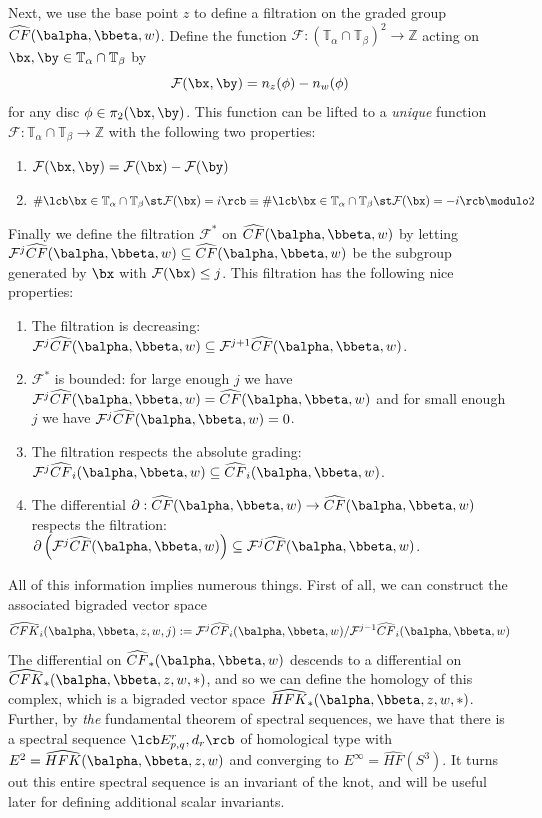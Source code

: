 Next, we use the base point $z$ to define a filtration on the graded group $\widehat{CF}(\balpha,\bbeta,w)$. Define the function $\mathcal F : (\mathbb T_\alpha \cap \mathbb T_\beta)^2 \rightarrow \mathbb Z$ acting on $\bx,\by \in \mathbb T_\alpha \cap \mathbb T_\beta$ by
\[ \mathcal F(\bx,\by) = n_z(\phi) - n_w(\phi) \]
for any disc $\phi \in \pi_2(\bx,\by)$. This function can be lifted to a \emph{unique} function $\mathcal F : \mathbb T_\alpha \cap \mathbb T_\beta \rightarrow \mathbb Z$ with the following two properties:
\begin{enumerate}
	\item $\mathcal F(\bx,\by) = \mathcal F(\bx) - \mathcal F(\by)$
	\item $\# \lcb \bx \in \mathbb T_\alpha \cap \mathbb T_\beta \st \mathcal F(\bx) = i \rcb \equiv \# \lcb \bx \in \mathbb T_\alpha \cap \mathbb T_\beta \st \mathcal F(\bx) = -i \rcb \modulo 2$
\end{enumerate}
Finally we define the filtration $\mathcal F^*$ on $\widehat{CF}(\balpha,\bbeta,w)$ by letting $\mathcal F^j \widehat{CF}(\balpha,\bbeta,w) \subseteq \widehat{CF}(\balpha,\bbeta,w)$ be the subgroup generated by $\bx$ with $\mathcal F(\bx) \leq j$. This filtration has the following nice properties:
\begin{enumerate}
	\item The filtration is decreasing: $\mathcal F^j \widehat{CF}(\balpha,\bbeta,w) \subseteq \mathcal F^{j+1} \widehat{CF}(\balpha,\bbeta,w)$.
	\item $\mathcal F^*$ is bounded: for large enough $j$ we have $\mathcal F^j\widehat{CF}(\balpha,\bbeta,w) = \widehat{CF}(\balpha,\bbeta,w)$ and for small enough $j$ we have $\mathcal F^j\widehat{CF}(\balpha,\bbeta,w)=0$.
	\item The filtration respects the absolute grading: $\mathcal F^j \widehat{CF}_i(\balpha,\bbeta,w) \subseteq \widehat{CF}_i(\balpha,\bbeta,w)$.
	\item The differential $\partial : \widehat{CF}(\balpha,\bbeta,w) \rightarrow \widehat{CF}(\balpha,\bbeta,w)$ respects the filtration: $\partial\left( \mathcal F^j\widehat{CF}(\balpha,\bbeta,w) \right) \subseteq \mathcal F^j \widehat{CF}(\balpha,\bbeta,w)$. 
\end{enumerate}
All of this information implies numerous things. First of all, we can construct the associated bigraded vector space
\[ \widehat{CFK}_i(\balpha,\bbeta,z,w,j) := \mathcal F^j \widehat{CF}_i(\balpha,\bbeta,w) / \mathcal F^{j-1} \widehat{CF}_i(\balpha,\bbeta,w) \]
The differential on $\widehat{CF}_*(\balpha,\bbeta,w)$ descends to a differential on $\widehat{CFK}_*(\balpha,\bbeta,z,w,*)$, and so we can define the homology of this complex, which is a bigraded vector space $\widehat{HFK}_*(\balpha,\bbeta,z,w,*)$. Further, by \emph{the} fundamental theorem of spectral sequences, we have that there is a spectral sequence $\lcb E_{p,q}^r,d_r \rcb$ of homological type with $E^2 = \widehat{HFK}(\balpha,\bbeta,z,w)$ and converging to $E^\infty = \widehat{HF}(S^3)$. It turns out this entire spectral sequence is an invariant of the knot, and will be useful later for defining additional scalar invariants.

